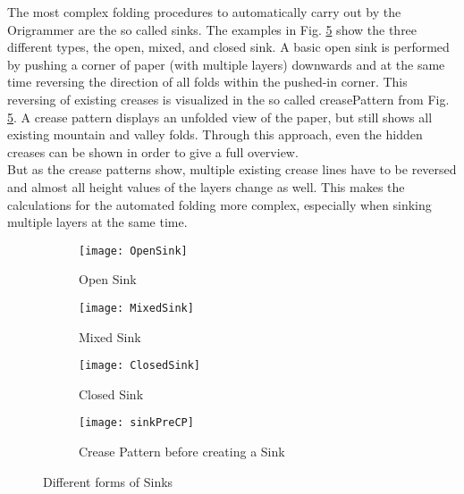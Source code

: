 The most complex folding procedures to automatically carry out by the Origrammer are the so called sinks. The examples in Fig. \ref{fig:sinks} show the three different types, the open, mixed, and closed sink. A basic open sink is performed by pushing a corner of paper (with multiple layers) downwards and at the same time reversing the direction of all folds within the pushed-in corner. This reversing of existing creases is visualized in the so called \gls{creasePattern} from Fig. \ref{fig:sinks}. A crease pattern displays an unfolded view of the paper, but still shows all existing mountain and valley folds. Through this approach, even the hidden creases can be shown in order to give a full overview.\\
But as the crease patterns show, multiple existing crease lines have to be reversed and almost all height values of the layers change as well. This makes the calculations for the automated folding more complex, especially when sinking multiple layers at the same time.
\begin{figure}[htbp]
	\centering
	\begin{subfigure}{\textwidth}
		\texttt{[image: OpenSink]}
		\caption{Open Sink}
		\label{fig:openSink}
	\end{subfigure}
	\begin{subfigure}{\textwidth}
		\texttt{[image: MixedSink]}
		\caption{Mixed Sink}
		\label{fig:mixedSink}
	\end{subfigure}
	\begin{subfigure}{\textwidth}
		\texttt{[image: ClosedSink]}
		\caption{Closed Sink}
		\label{fig:closedSink}
	\end{subfigure}
	\begin{subfigure}{\textwidth}
	        \centering
		\texttt{[image: sinkPreCP]}
		\caption{Crease Pattern before creating a Sink}
		\label{fig:sinkPreCP}
	\end{subfigure}
	\caption[Different forms of Sinks]{Different forms of Sinks\footnotemark}
	\label{fig:sinks}
\end{figure}

